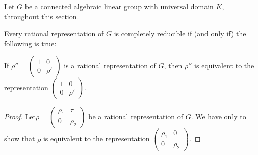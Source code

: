 \eject

\medskip
{}

Let $G$  be a connected algebraic linear group with  universal domain
$K$, throughout this section. 

\begin{thm}\label{chap6:thm4}%
  Every rational representation of $G$ is completely reducible if (and
  only if) the following is true: 
  
  If $ \rho''=\begin{pmatrix}
  1 & 0 \\0 & \rho'
  \end{pmatrix} $
  is a rational representation of $G$, then $\rho''$ is equivalent to
  the representation  
  $\begin{pmatrix}
    1 & 0 \\0 & \rho'
  \end{pmatrix}$.
\end{thm}

\begin{proof}
  Let$ \rho=
  \begin{pmatrix}
    \rho _1 & \tau \\0 & \rho_2
  \end{pmatrix}$
  be a rational representation of $G$. We have only to show that
  $\rho$ is equivalent to the representation  
  $\begin{pmatrix}
    \rho_1 & 0\\ 0 & \rho_2
  \end{pmatrix}$.
\end{proof}
    

